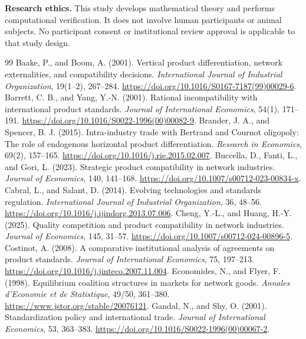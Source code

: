 \documentclass[11pt,a4paper]{article}
\theoremstyle{remark}\newtheorem{remark}[theorem]{Remark}
\begin{document}
\noindent\textbf{Research ethics.} This study develops mathematical theory and performs computational verification. It does not involve human participants or animal subjects. No participant consent or institutional review approval is applicable to that study design.

\begin{thebibliography}{99}\footnotesize\setlength{\itemsep}{1pt}
 Baake, P., and Boom, A. (2001). Vertical product differentiation, network externalities, and compatibility decisions. \emph{International Journal of Industrial Organization}, 19(1--2), 267--284. \url{https://doi.org/10.1016/S0167-7187(99)00029-6}.
 Barrett, C. B., and Yang, Y.-N. (2001). Rational incompatibility with international product standards. \emph{Journal of International Economics}, 54(1), 171--191. \url{https://doi.org/10.1016/S0022-1996(00)00082-9}.
 Brander, J. A., and Spencer, B. J. (2015). Intra-industry trade with Bertrand and Cournot oligopoly: The role of endogenous horizontal product differentiation. \emph{Research in Economics}, 69(2), 157--165. \url{https://doi.org/10.1016/j.rie.2015.02.007}.
 Buccella, D., Fanti, L., and Gori, L. (2023). Strategic product compatibility in network industries. \emph{Journal of Economics}, 140, 141--168. \url{https://doi.org/10.1007/s00712-023-00834-x}.
 Cabral, L., and Salant, D. (2014). Evolving technologies and standards regulation. \emph{International Journal of Industrial Organization}, 36, 48--56. \url{https://doi.org/10.1016/j.ijindorg.2013.07.006}.
 Cheng, Y.-L., and Huang, H.-Y. (2025). Quality competition and product compatibility in network industries. \emph{Journal of Economics}, 145, 31--57. \url{https://doi.org/10.1007/s00712-024-00896-5}.
 Costinot, A. (2008). A comparative institutional analysis of agreements on product standards. \emph{Journal of International Economics}, 75, 197--213. \url{https://doi.org/10.1016/j.jinteco.2007.11.004}.
 Economides, N., and Flyer, F. (1998). Equilibrium coalition structures in markets for network goods. \emph{Annales d'Economie et de Statistique}, 49/50, 361--380. \url{https://www.jstor.org/stable/20076121}.
 Gandal, N., and Shy, O. (2001). Standardization policy and international trade. \emph{Journal of International Economics}, 53, 363--383. \url{https://doi.org/10.1016/S0022-1996(00)00067-2}.

\end{thebibliography}
\end{document}
